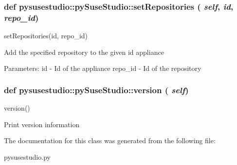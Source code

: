  \hypertarget{classpysusestudio_1_1py_suse_studio_a9ae92820c58858bf901366c3d003b305}{
\subsubsection[{setRepositories}]{\setlength{\rightskip}{0pt plus 5cm}def pysusestudio::pySuseStudio::setRepositories ( {\em self}, \/   {\em id}, \/   {\em repo\_\-id})}}
\label{classpysusestudio_1_1py_suse_studio_a9ae92820c58858bf901366c3d003b305}
\begin{DoxyVerb}setRepositories(id, repo_id)

            Add the specified repository to the given id appliance
            
            Parameters:
id - Id of the appliance
repo_id - Id of the repository

\end{DoxyVerb}
 \hypertarget{classpysusestudio_1_1py_suse_studio_a0c239e92b36b5de984effab04f51417a}{
\subsubsection[{version}]{\setlength{\rightskip}{0pt plus 5cm}def pysusestudio::pySuseStudio::version ( {\em self})}}
\label{classpysusestudio_1_1py_suse_studio_a0c239e92b36b5de984effab04f51417a}
\begin{DoxyVerb}version()

            Print version information

\end{DoxyVerb}
 

The documentation for this class was generated from the following file:\begin{DoxyCompactItemize}
\item 
pysusestudio.py\end{DoxyCompactItemize}
